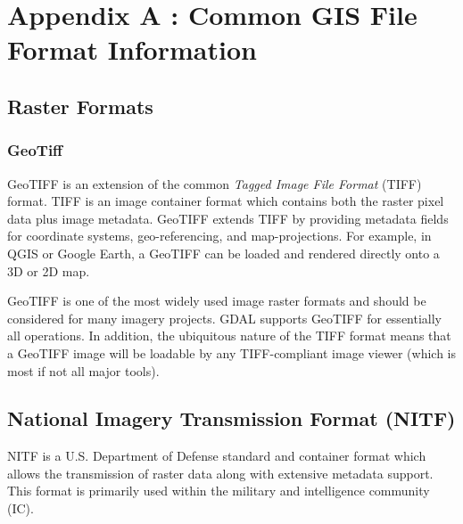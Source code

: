 %
%



\chapter*{Appendix A : Common GIS File Format Information}


\section*{Raster Formats}


\subsection*{GeoTiff}
GeoTIFF is an extension of the common \emph{Tagged Image File Format} (TIFF) format.  TIFF
is an image container format which contains both the raster pixel data plus image metadata.  
GeoTIFF extends TIFF by providing metadata fields for coordinate systems, geo-referencing, and 
map-projections.  For example, in QGIS or Google Earth, a GeoTIFF can be loaded and rendered 
directly onto a 3D or 2D map.
    
GeoTIFF is one of the most widely used image raster formats and should be considered for many 
imagery projects.  GDAL supports GeoTIFF for essentially all operations.  In addition, the 
ubiquitous nature of the TIFF format means that a GeoTIFF image will be loadable by any TIFF-compliant
image viewer (which is most if not all major tools).


\section*{National Imagery Transmission Format (NITF)}
NITF is a U.S. Department of Defense standard and container format which allows the transmission of
raster data along with extensive metadata support.  This format is primarily used within the military and
intelligence community (IC).  



